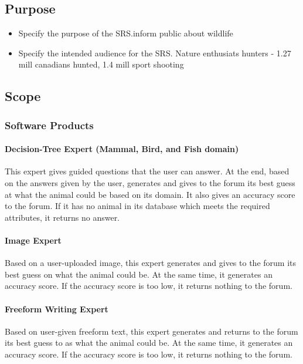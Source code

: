 \documentclass[]{article}
\begin{document}
\subsection{Purpose}
\label{sub:purpose}
\begin{itemize}
	\item Specify the purpose of the SRS.\newline inform public about wildlife 
	\item Specify the intended audience for the SRS.\newline
	Nature enthusiats 	\newline
	hunters - 1.27 mill canadians hunted, 1.4 mill sport shooting 	
\end{itemize}

\subsection{Scope}
\label{sub:scope}
\subsubsection{Software Products}
\paragraph{Decision-Tree Expert (Mammal, Bird, and Fish domain)}
This expert gives guided questions that the user can answer. At the end, based on the answers given by the user, generates and gives to the forum
its best guess at what the animal could be based on its domain. It also gives an accuracy score to the forum. If it has no animal in its database which meets the required attributes, 
it returns no answer.
\paragraph{Image Expert}
Based on a user-uploaded image, this expert generates and gives to the forum its best guess on what the animal could be. At the same time, it generates an accuracy score. If the accuracy score is
too low, it returns nothing to the forum.
\paragraph{Freeform Writing Expert}
Based on user-given freeform text, this expert generates and returns to the forum its best guess to as what the animal could be. At the same time, it generates an accuracy score. If the accuracy score 
is too low, it returns nothing to the forum.
\end{document}
